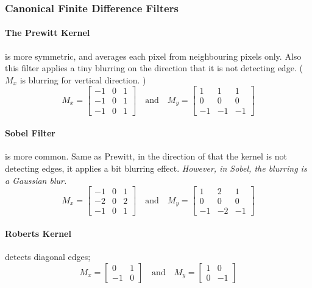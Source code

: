 \documentclass[11pt]{article}
\begin{document}
\subsubsection{Canonical Finite Difference Filters}
\paragraph{The Prewitt Kernel} is more symmetric, and averages each pixel from neighbouring pixels only. Also this filter applies a tiny blurring on the direction that it is not detecting edge. ($M_x$ is blurring for vertical direction. )
\begin{equation}
	M_x = 
	\begin{bmatrix}
		-1 & 0 & 1 \\
		-1 & 0 & 1 \\
		-1 & 0 & 1
	\end{bmatrix} \quad \text{and} \quad M_y = \begin{bmatrix}
		1 & 1 & 1 \\
		0 & 0 & 0 \\
		-1 & -1 & -1
	\end{bmatrix}
\end{equation}

\paragraph{Sobel Filter} is more common. Same as Prewitt, in the direction of that the kernel is not detecting edges, it applies a bit blurring effect. \textit{However, in Sobel, the blurring is a Gaussian blur.}  
\begin{equation}
	M_x = 
	\begin{bmatrix}
		-1 & 0 & 1 \\
		-2 & 0 & 2 \\
		-1 & 0 & 1
	\end{bmatrix} \quad \text{and} \quad M_y = \begin{bmatrix}
		1 & 2 & 1 \\
		0 & 0 & 0 \\
		-1 & -2 & -1
	\end{bmatrix}
\end{equation}

\paragraph{Roberts Kernel} detects diagonal edges; 
\begin{equation}
	M_x = \begin{bmatrix}
		0 & 1 \\
		-1 & 0
	\end{bmatrix} \quad \text{and} \quad M_y = \begin{bmatrix}
		1 & 0 \\
		0 & -1
	\end{bmatrix}
\end{equation}
\end{document}
